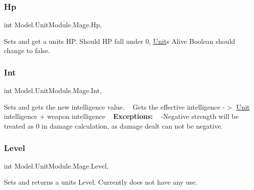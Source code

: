 \subsubsection{\texorpdfstring{Hp}{Hp}}
{\footnotesize\ttfamily int Model.\+Unit\+Module.\+Mage.\+Hp\hspace{0.3cm}{\ttfamily [get]}, {\ttfamily [set]}}

Sets and get a unit\textquotesingle{}s HP. Should HP fall under 0, \hyperlink{interface_model_1_1_unit_module_1_1_unit}{Unit}\textquotesingle{}s Alive Boolean should change to false. \hypertarget{class_model_1_1_unit_module_1_1_mage_aff8f2ffa9c6e416278d2ef5a4a39e7ba}{}\label{class_model_1_1_unit_module_1_1_mage_aff8f2ffa9c6e416278d2ef5a4a39e7ba} 
\subsubsection{\texorpdfstring{Int}{Int}}
{\footnotesize\ttfamily int Model.\+Unit\+Module.\+Mage.\+Int\hspace{0.3cm}{\ttfamily [get]}, {\ttfamily [set]}}

Sets and gets the new intelligence value. ~\newline
 Gets the effective intelligence -\/$>$ \hyperlink{interface_model_1_1_unit_module_1_1_unit}{Unit} intelligence + weapon intelligence ~\newline
 {\bfseries Exceptions\+:} ~\newline
 -\/\+Negative strength will be treated as 0 in damage calculation, as damage dealt can not be negative. \hypertarget{class_model_1_1_unit_module_1_1_mage_a3ee8585a9a8ef0f49de9e56638c6651e}{}\label{class_model_1_1_unit_module_1_1_mage_a3ee8585a9a8ef0f49de9e56638c6651e} 
\subsubsection{\texorpdfstring{Level}{Level}}
{\footnotesize\ttfamily int Model.\+Unit\+Module.\+Mage.\+Level\hspace{0.3cm}{\ttfamily [get]}, {\ttfamily [set]}}

Sets and returns a unit\textquotesingle{}s Level. Currently does not have any use. \hypertarget{class_model_1_1_unit_module_1_1_mage_ae115e4497d06b8938ceee7344dd1350d}{}\label{class_model_1_1_unit_module_1_1_mage_ae115e4497d06b8938ceee7344dd1350d} 
